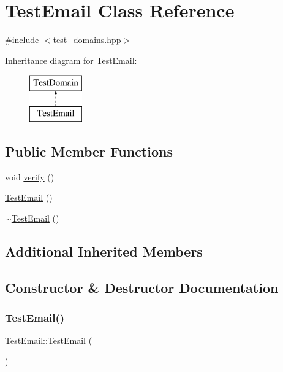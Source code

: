 \hypertarget{class_test_email}{}\section{Test\+Email Class Reference}
\label{class_test_email}


{\ttfamily \#include $<$test\+\_\+domains.\+hpp$>$}

Inheritance diagram for Test\+Email\+:\begin{figure}[H]
\begin{center}
\leavevmode
\includegraphics[height=2.000000cm]{class_test_email}
\end{center}
\end{figure}
\subsection*{Public Member Functions}
\begin{DoxyCompactItemize}
\item 
void \hyperlink{class_test_email_a55b1f52af1f5b8672c9668652384578f}{verify} ()
\item 
\hyperlink{class_test_email_a758c46261eb6b1d0570e017b95d79bd4}{Test\+Email} ()
\item 
\hyperlink{class_test_email_ad1019728841de85fb998a46aa974d9e6}{$\sim$\+Test\+Email} ()
\end{DoxyCompactItemize}
\subsection*{Additional Inherited Members}


\subsection{Constructor \& Destructor Documentation}
\mbox{\label{class_test_email_a758c46261eb6b1d0570e017b95d79bd4}} 
\subsubsection{\texorpdfstring{Test\+Email()}{TestEmail()}}
{\footnotesize\ttfamily Test\+Email\+::\+Test\+Email (\begin{DoxyParamCaption}{ }\end{DoxyParamCaption})}

